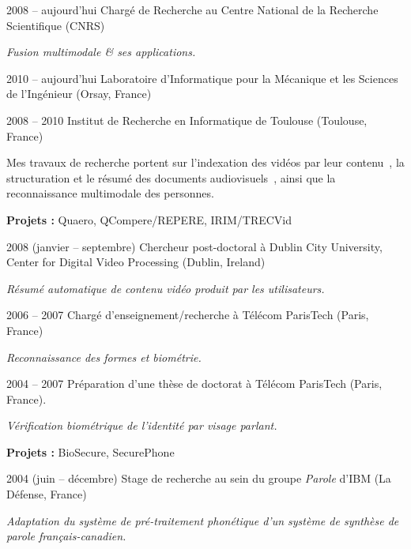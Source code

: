 \documentclass{simplecv}
\begin{document}
\begin{topic}
\item[2008 -- aujourd'hui] Charg\'{e} de Recherche au Centre National de la Recherche Scientifique (CNRS)

\emph{Fusion multimodale \& ses applications.}

\begin{topic}
	\item[2010 -- aujourd'hui] Laboratoire d'Informatique pour la M\'{e}canique et les Sciences de l'Ing\'{e}nieur (Orsay, France)
	\item[2008 -- 2010] Institut de Recherche en Informatique de Toulouse (Toulouse, France)
\end{topic}

Mes travaux de recherche portent sur l'indexation des vid\'{e}os par leur contenu~\cite{Bredin2012a}, la structuration et le r\'{e}sum\'{e} des documents audiovisuels~\cite{Bredin2012}, ainsi que la reconnaissance multimodale des personnes.

\textbf{Projets :} Quaero, QCompere/REPERE, IRIM/TRECVid

\item[2008 (janvier -- septembre)] Chercheur post-doctoral \`{a} Dublin City University,\\ Center for Digital Video Processing (Dublin, Ireland)

\emph{R\'{e}sum\'{e} automatique de contenu vid\'{e}o produit par les utilisateurs.}

\item[2006 -- 2007] Charg\'{e} d'enseignement/recherche \`{a} T\'{e}l\'{e}com ParisTech (Paris, France)

\emph{Reconnaissance des formes et biom\'{e}trie.}

\item[2004 -- 2007] Pr\'{e}paration d'une th\`{e}se de doctorat \`{a} T\'{e}l\'{e}com ParisTech (Paris, France).

\emph{V\'{e}rification biom\'{e}trique de l'identit\'{e} par visage parlant.}

\textbf{Projets :} BioSecure, SecurePhone

\item[2004 (juin -- d\'{e}cembre)] Stage de recherche au sein du groupe \emph{Parole} d'IBM (La D\'{e}fense, France)

\emph{Adaptation du syst\`{e}me de pr\'{e}-traitement phon\'{e}tique d'un syst\`{e}me de synth\`{e}se de parole fran\c{c}ais-canadien.}
\end{topic}
\end{document}
